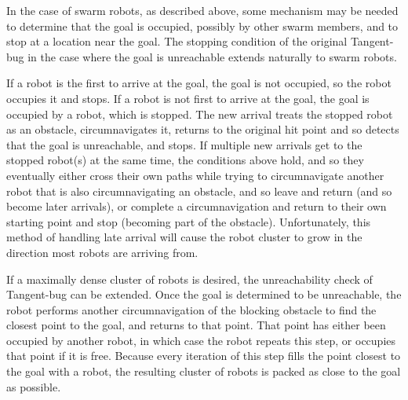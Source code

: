 In the case of swarm robots, as described above, some mechanism may be needed to determine that the goal is occupied, possibly by other swarm members, and to stop at a location near the goal. 
The stopping condition of the original Tangent-bug in the case where the goal is unreachable extends naturally to swarm robots. 

If a robot is the first to arrive at the goal, the goal is not occupied, so the robot occupies it and stops. 
If a robot is not first to arrive at the goal, the goal is occupied by a robot, which is stopped. 
The new arrival treats the stopped robot as an obstacle, circumnavigates it, returns to the original hit point and so detects that the goal is unreachable, and stops. 
If multiple new arrivals get to the stopped robot(s) at the same time, the conditions above hold, and so they eventually either cross their own paths while trying to circumnavigate another robot that is also circumnavigating an obstacle, and so leave and return (and so become later arrivals), or complete a circumnavigation and return to their own starting point and stop (becoming part of the obstacle).
Unfortunately, this method of handling late arrival will cause the robot cluster to grow in the direction most robots are arriving from. 

If a maximally dense cluster of robots is desired, the unreachability check of Tangent-bug can be extended. 
Once the goal is determined to be unreachable, the robot performs another circumnavigation of the blocking obstacle to find the closest point to the goal, and returns to that point. 
That point has either been occupied by another robot, in which case the robot repeats this step, or occupies that point if it is free. 
Because every iteration of this step fills the point closest to the goal with a robot, the resulting cluster of robots is packed as close to the goal as possible. 


